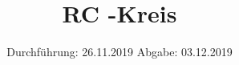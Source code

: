 

\subject{V353}
\title{RC -Kreis}
\date{%
  Durchführung: 26.11.2019
  \hspace{3em}
  Abgabe: 03.12.2019
}



\maketitle
\thispagestyle{empty}
\tableofcontents
\newpage







\printbibliography{}


